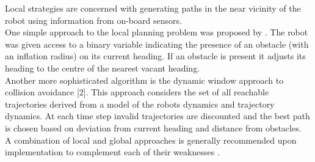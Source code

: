 \documentclass[capstone_report.tex]{subfiles}
\begin{document}
Local strategies are concerned with generating paths in the near vicinity of the robot using information from on-board sensors.\\ 

One simple approach to the local planning problem was proposed by \cite{savkin2014simple}.  The robot was given access to a binary variable indicating the presence of an obstacle (with an inflation radius) on its current heading.  If an obstacle is present it adjusts its heading to the centre of the nearest vacant heading.\\

Another more sophisticated algorithm is the dynamic window approach to collision avoidance [2].  This approach considers the set of all reachable trajectories derived from a model of the robots dynamics and trajectory dynamics.  At each time step invalid trajectories are discounted and the best path is chosen based on deviation from current heading and distance from obstacles.  \\

A combination of local and global approaches is generally recommended upon implementation to complement each of their weaknesses \cite{mac2016heuristic}.
\end{document}
